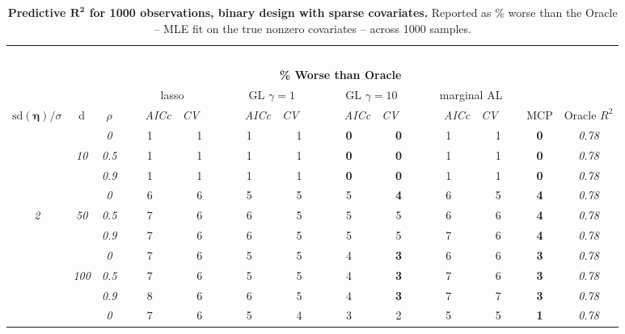\clearpage
\begin{table}
\vspace{-.2cm}
\footnotesize
\caption{ 
	{\bf  Predictive $\boldsymbol{R^2}$ for 1000 observations, 
	binary design with sparse covariates.}
  Reported as  \% worse than the Oracle 
  -- MLE fit on the true nonzero covariates -- 
  across 1000 samples.}
\begin{center}
\begin{tabular}{ccc|cc|cc|cc|cc|c|c}
\hline &&&\multicolumn{9}{|c|}{~}\\[-1ex]
\multicolumn{3}{c}{~}&\multicolumn{9}{|c|}{\bf \% Worse than Oracle } &   \\[1ex]
& &
& \multicolumn{2}{c}{lasso} 
& \multicolumn{2}{c}{GL $\gamma=1$} 
& \multicolumn{2}{c}{GL $\gamma=10$} 
& \multicolumn{2}{c}{marginal AL} 
& \multicolumn{1}{c|}{~} & \\[-0.5ex]
$\mathrm{sd}(\boldsymbol{\eta})/\sigma$ & {\sf d} & $\rho$ 
& ~~~\scriptsize\it AICc & \multicolumn{1}{c}{\scriptsize\it CV~~~}
& ~~~\scriptsize\it AICc & \multicolumn{1}{c}{\scriptsize\it CV~~~}
& ~~~\scriptsize\it AICc & \multicolumn{1}{c}{\scriptsize\it CV~~~}
& ~~~\scriptsize\it AICc & \multicolumn{1}{c}{\scriptsize\it CV~~~} 
& \multicolumn{1}{c|}{ MCP} & Oracle $R^2$ \\[.5ex]
\hline\rule{0pt}{3ex}
& & \it  0  & 1 & 1 & 1 & 1 & {\bf 0} & {\bf 0} & 1 & 1 & {\bf 0} & \it  0.78 \\
 & \it  10  & \it  0.5  & 1 & 1 & 1 & 1 & {\bf 0} & {\bf 0} & 1 & 1 & {\bf 0} & \it  0.78 \\
& & \it  0.9  & 1 & 1 & 1 & 1 & {\bf 0} & {\bf 0} & 1 & 1 & {\bf 0} & \it  0.78 \\[1ex]
\cline{2-3}\rule{0pt}{3ex}
& & \it  0  & 6 & 6 & 5 & 5 & 5 & {\bf 4} & 6 & 5 & {\bf 4} & \it  0.78 \\
\it  2  & \it  50  & \it  0.5  & 7 & 6 & 6 & 5 & 5 & 5 & 6 & 6 & {\bf 4} & \it  0.78 \\
& & \it  0.9  & 7 & 6 & 6 & 5 & 5 & 5 & 7 & 6 & {\bf 4} & \it  0.78 \\[1ex]
\cline{2-3}\rule{0pt}{3ex}
& & \it  0  & 7 & 6 & 5 & 5 & 4 & {\bf 3} & 6 & 6 & {\bf 3} & \it  0.78 \\
 & \it  100  & \it  0.5  & 7 & 6 & 5 & 5 & 4 & {\bf 3} & 7 & 6 & {\bf 3} & \it  0.78 \\
& & \it  0.9  & 8 & 6 & 6 & 5 & 4 & {\bf 3} & 7 & 7 & {\bf 3} & \it  0.78 \\[1ex]
\cline{2-3}\rule{0pt}{3ex}
& & \it  0  & 7 & 6 & 5 & 4 & 3 & 2 & 5 & 5 & {\bf 1} & \it  0.78 \\

\end{tabular}
\end{center}
\end{table}
